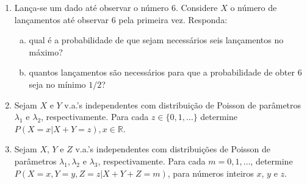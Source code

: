 \documentclass[../Notas.tex]{subfiles}
\begin{document}
\begin{enumerate}
\begin{enumerate}[a)]
    \end{enumerate}
    \item Lança-se um dado até observar o número 6. Considere $X$ o número de lançamentos até observar 6 pela primeira vez. Responda:
    \begin{enumerate}[a)]
    \item qual é a probabilidade de que sejam necessários seis lançamentos no máximo?
    \item quantos lançamentos são necessários para que a probabilidade de obter 6 seja no mínimo $1/2$?
    \end{enumerate}
    \item Sejam $X$ e $Y$ v.a.'s independentes com distribuição de Poisson de parâmetros $\lambda_1$ e $\lambda_2$, respectivamente. Para cada $z\in\{0,1,\dots\}$ determine $P(X=x|X+Y=z), x\in\mathbb{R}$.
    \item Sejam $X$, $Y$ e $Z$ v.a.'s independentes com distribuições de Poisson de parâmetros $\lambda_1, \lambda_2$ e $\lambda_3$, respectivamente. Para cada $m=0,1,\dots$, determine  $P(X=x, Y=y, Z=z|X+Y+Z=m)$, para números inteiros $x$, $y$ e $z$.
\end{enumerate}
\end{document}
